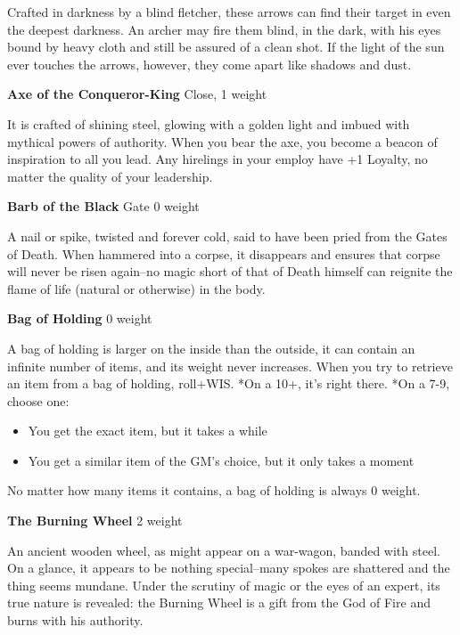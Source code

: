 Crafted in darkness by a blind fletcher, these arrows can find their target in even the deepest darkness. An archer may fire them blind, in the dark, with his eyes bound by heavy cloth and still be assured of a clean shot. If the light of the sun ever touches the arrows, however, they come apart like shadows and dust.

{\noindent \bfseries Axe of the Conqueror-King} \hspace*{\fill} Close, 1 weight

It is crafted of shining steel, glowing with a golden light and imbued with mythical powers of authority. When you bear the axe, you become a beacon of inspiration to all you lead. Any hirelings in your employ have +1 Loyalty, no matter the quality of your leadership.

{\noindent \bfseries Barb of the Black} \hspace*{\fill} Gate 0 weight

A nail or spike, twisted and forever cold, said to have been pried from the Gates of Death. When hammered into a corpse, it disappears and ensures that corpse will never be risen again--no magic short of that of Death himself can reignite the flame of life (natural or otherwise) in the body.

{\noindent \bfseries Bag of Holding} \hspace*{\fill} 0 weight

A bag of holding is larger on the inside than the outside, it can contain an infinite number of items, and its weight never increases. When you try to retrieve an item from a bag of holding, roll+WIS. *On a 10+, it's right there. *On a 7-9, choose one:
\begin{itemize}
\item You get the exact item, but it takes a while
\item You get a similar item of the GM's choice, but it only takes a moment

\end{itemize}

No matter how many items it contains, a bag of holding is always 0 weight.

{\noindent \bfseries The Burning Wheel} \hspace*{\fill} 2 weight

An ancient wooden wheel, as might appear on a war-wagon, banded with steel. On a glance, it appears to be nothing special--many spokes are shattered and the thing seems mundane. Under the scrutiny of magic or the eyes of an expert, its true nature is revealed: the Burning Wheel is a gift from the God of Fire and burns with his authority.

